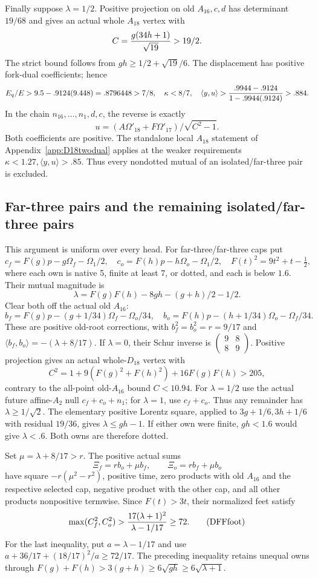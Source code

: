 \documentclass[11pt]{article}
\theoremstyle{definition}
\theoremstyle{remark}
\newcommand{\ip}[2]{\langle #1,#2\rangle}
\begin{document}
Finally suppose \(\lambda=1/2\).
Positive projection on old \(A_{16},c,d\) has determinant
\(19/68\) and gives an actual whole \(A_{18}\) vertex with
\[
 C={g(34h+1)\over\sqrt{19}}>19/2 .
\]
The strict bound follows from
\(gh\ge1/2+\sqrt{19}/6\).
The displacement has positive fork-dual coefficients; hence
\[
 E_q/E>9.5-.9124(9.448)=.8796448>7/8,\quad
 \kappa<8/7,\quad
 \ip yu>{.9944-.9124\over1-.9944(.9124)}>.884 .
\]
In the chain \(n_{16},\ldots,n_1,d,c\), the reverse is exactly
\[
             u=(A\Omega'_{18}+F\Omega'_{17})/
                         \sqrt{C^2-1}.
\]
Both coefficients are positive.
The standalone local \(A_{18}\) statement of
Appendix~\ref{app:D18twodual} applies at the weaker requirements
\(\kappa<1.27,\ip yu>.85\).
Thus every nondotted mutual of an isolated/far-three pair is excluded.

\subsection{Far-three pairs and the remaining isolated/far-three pairs}
\label{app:D18farpairexits}

This argument is uniform over every head.
For far-three/far-three caps put
\[
 c_f=F(g)p-g\Omega_f-\Omega_1/2,\quad
 c_o=F(h)p-h\Omega_o-\Omega_1/2,\quad
 F(t)^2=9t^2+t-\tfrac12 ,
\]
where each own is native 5, finite at least 7, or dotted,
and each is below \(1.6\).
Their mutual magnitude is
\[
 \lambda=F(g)F(h)-8gh-(g+h)/2-1/2 .
\]
Clear both off the actual old \(A_{16}\):
\[
 b_f=F(g)p-(g+1/34)\Omega_f-\Omega_o/34,\quad
 b_o=F(h)p-(h+1/34)\Omega_o-\Omega_f/34 .
\]
These are positive old-root corrections, with
\(b_f^2=b_o^2=r=9/17\) and
\(\ip{b_f}{b_o}=-(\lambda+8/17)\).
If \(\lambda=0\), their Schur inverse is
\(\left(\begin{smallmatrix}9&8\\8&9\end{smallmatrix}\right)\).
Positive projection gives an actual whole-\(D_{18}\) vertex with
\[
 C^2=1+9(F(g)^2+F(h)^2)+16F(g)F(h)>205,
\]
contrary to the all-point old-\(A_{16}\) bound \(C<10.94\).
For \(\lambda=1/2\) use the actual future affine-\(A_2\) null
\(c_f+c_o+n_1\); for \(\lambda=1\), use \(c_f+c_o\).
Thus any remainder has \(\lambda\ge1/\sqrt2\).
The elementary positive Lorentz square, applied to
\(3g+1/6,3h+1/6\) with residual \(19/36\), gives
\(\lambda\le gh-1\).
If either own were finite, \(gh<1.6\) would give
\(\lambda<.6\).  Both owns are therefore dotted.

Set \(\mu=\lambda+8/17>r\).
The positive actual sums
\[
 \Xi_f=r b_o+\mu b_f,\qquad \Xi_o=r b_f+\mu b_o
\]
have square \(-r(\mu^2-r^2)\), positive time, zero products
with old \(A_{16}\) and the respective selected cap,
negative product with the other cap, and all other products
nonpositive termwise.
Since \(F(t)>3t\), their normalized feet satisfy
\[
 \max(C_f^2,C_o^2)>
 {17(\lambda+1)^2\over\lambda-1/17}\ge72.
\tag{DFFfoot}\label{eq:DFFfoot}
\]
For the last inequality, put \(a=\lambda-1/17\) and use
\(a+36/17+(18/17)^2/a\ge72/17\).
The preceding inequality retains unequal owns through
\(F(g)+F(h)>3(g+h)\ge6\sqrt{gh}\ge6\sqrt{\lambda+1}\).
\end{document}
